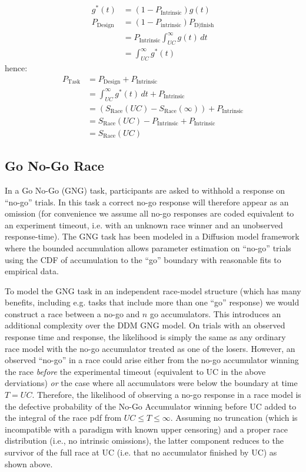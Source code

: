 \documentclass[12pt,a4paper,one side]{article}
\begin{document}
\begin{align}
    g^*(t) &= (1-P_{\text{Intrinsic}}) g(t) \nonumber \\
    P_{\text{Design}} &= (1-P_{\text{intrinsic}})P_{\text{D|finish}} \nonumber  \\
    &= P_{\text{Intrinsic}}\int_{UC}^{\infty} g(t)\, dt \nonumber  \\
    &= \int_{UC}^{\infty} g^*(t)
\end{align}
hence:
\begin{align}
    P_{\text{Task}} &= P_{\text{Design}} + P_{\text{Intrinsic}} \nonumber  \\
    &= \int_{UC}^{\infty} g^*(t) \, dt + P_{\text{Intrinsic}} \nonumber \\
    &= (S_{\text{Race}}(UC) - S_{\text{Race}}(\infty)) + P_{\text{Intrinsic}} \nonumber \\
    &= S_{\text{Race}}(UC) - P_{\text{Intrinsic}} + P_{\text{Intrinsic}} \nonumber \\
    &= S_{\text{Race}}(UC) \nonumber 
\end{align}

\subsection*{Go No-Go Race}
In a Go No-Go (GNG) task, participants are asked to withhold a response on ``no-go'' trials. In this task a correct no-go response will therefore appear as an omission (for convenience we assume all no-go responses are coded equivalent to an experiment timeout, i.e. with an unknown race winner and an unobserved response-time). The GNG task has been modeled in a Diffusion model framework where the bounded accumulation allows parameter estimation on ``no-go'' trials using the CDF of accumulation to the ``go'' boundary with reasonable fits to empirical data. 

To model the GNG task in an independent race-model structure (which has many benefits, including e.g. tasks that include more than one ``go'' response) we would construct a race between a no-go and $n$ go accumulators. This introduces an additional complexity over the DDM GNG model. On trials with an observed response time and response, the likelihood is simply the same as any ordinary race model with the no-go accumulator treated as one of the losers. However, an observed ``no-go'' in a race could arise either from the no-go accumulator winning the race \textit{before} the experimental timeout (equivalent to UC in the above derviations) \textit{or} the case where all accumulators were below the boundary at time $T=UC$. Therefore, the likelihood of observing a no-go response in a race model is the defective probability of the No-Go Accumulator winning before UC added to the integral of the race pdf from $UC \leq T \leq \infty$. Assuming no truncation (which is incompatible with a paradigm with known upper censoring) and a proper race distribution (i.e., no intrinsic omissions), the latter component reduces to the survivor of the full race at UC (i.e. that no accumulator finished by UC) as shown above.
\end{document}

